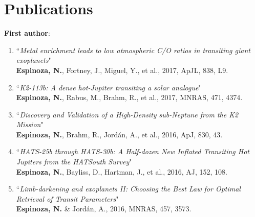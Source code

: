\documentclass[11pt, a4paper]{article} %
\begin{document}
\section*{Publications}
\begin{flushleft}%
  \setlength{\leftskip}{0.2cm}%
\textbf{First author}:
\begin{enumerate}
\setlength\itemsep{0.05cm}
\item ``\textit{Metal enrichment leads to low atmospheric C/O ratios in transiting giant exoplanets}"\\
          \textbf{Espinoza, N.}, Fortney, J., Miguel, Y., et al., 2017, ApJL, 838, L9.

\item ``\textit{K2-113b: A dense hot-Jupiter transiting a solar analogue}"\\
          \textbf{Espinoza, N.}, Rabus, M., Brahm, R., et al., 2017, MNRAS, 471, 4374.

\item ``\textit{Discovery and Validation of a High-Density sub-Neptune from the K2 Mission}"\\
          \textbf{Espinoza, N.}, Brahm, R., Jord\'an, A., et al., 2016, ApJ, 830, 43.

\item ``\textit{HATS-25b through HATS-30b: A Half-dozen New Inflated Transiting Hot Jupiters from the HATSouth Survey}"\\
          \textbf{Espinoza, N.}, Bayliss, D., Hartman, J., et al., 2016, AJ, 152, 108.

\item ``\textit{Limb-darkening and exoplanets II: Choosing the Best Law for Optimal Retrieval of Transit Parameters}"\\
          \textbf{Espinoza, N.} \& Jord\'an, A., 2016, MNRAS, 457, 3573.
          

\end{enumerate}
\end{flushleft}
\end{document}
